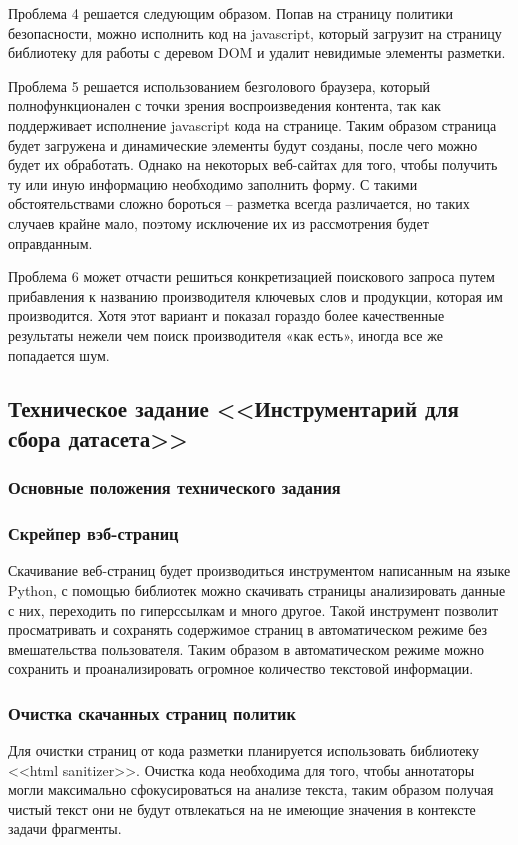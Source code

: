 \documentclass[../main]{subfiles}
\begin{document}
Проблема 4 решается следующим образом. Попав на страницу политики безопасности, можно исполнить код на javascript, который загрузит на страницу библиотеку для работы с деревом DOM и удалит невидимые элементы разметки.

Проблема 5 решается использованием безголового браузера, который полнофункционален с точки зрения воспроизведения контента, так как поддерживает исполнение javascript кода на странице. Таким образом страница будет загружена и динамические элементы будут созданы, после чего можно будет их обработать. Однако на некоторых веб-сайтах для того, чтобы получить ту или иную информацию необходимо заполнить форму. С такими обстоятельствами сложно бороться – разметка всегда различается, но таких случаев крайне мало, поэтому исключение их из рассмотрения будет оправданным.

Проблема 6 может отчасти решиться конкретизацией поискового запроса путем прибавления к названию производителя ключевых слов и продукции, которая им производится. Хотя этот вариант и показал гораздо более качественные результаты нежели чем поиск производителя «как есть», иногда все же попадается шум.

\subsection{Техническое задание <<Инструментарий для сбора датасета>>}

\subsubsection{Основные положения технического задания}

\subsubsection{Скрейпер вэб-страниц}
Скачивание веб-страниц будет производиться инструментом написанным на языке Python, с помощью библиотек можно скачивать страницы анализировать данные с них, переходить по гиперссылкам и много другое. Такой инструмент позволит просматривать и сохранять содержимое страниц в автоматическом режиме без вмешательства пользователя. Таким образом в автоматическом режиме можно сохранить и проанализировать огромное количество текстовой информации.

\subsubsection{Очистка скачанных страниц политик}
Для очистки страниц от кода разметки планируется использовать библиотеку <<html sanitizer>>. Очистка кода необходима для того, чтобы аннотаторы могли максимально сфокусироваться на анализе текста, таким образом получая чистый текст они не будут отвлекаться на не имеющие значения в контексте задачи фрагменты.
\end{document}
